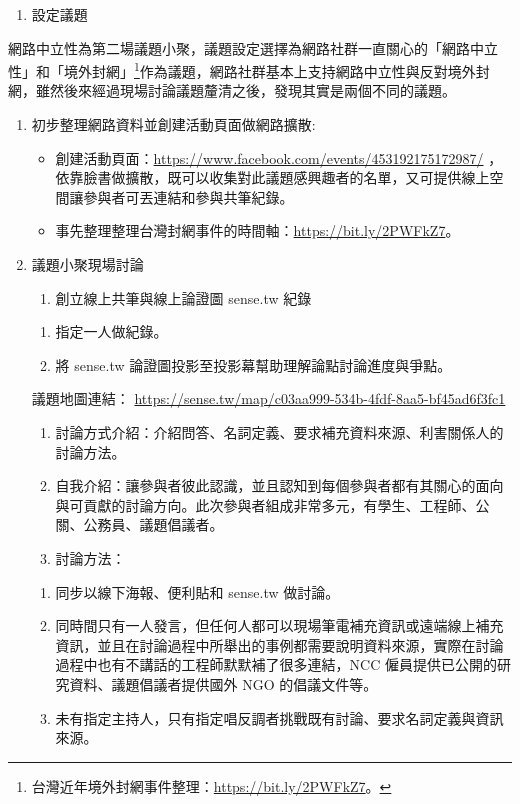 \documentclass[12pt,a4paper]{article}
\begin{document}
\begin{enumerate}
\begin{enumerate}
\item 設定議題
\end{enumerate}
網路中立性為第二場議題小聚，議題設定選擇為網路社群一直關心的「網路中立性」和「境外封網」\footnote{台灣近年境外封網事件整理：\url{https://bit.ly/2PWFkZ7}。}作為議題，網路社群基本上支持網路中立性與反對境外封網，雖然後來經過現場討論議題釐清之後，發現其實是兩個不同的議題。
\begin{enumerate}
\item 初步整理網路資料並創建活動頁面做網路擴散:
\begin{itemize}
\item 創建活動頁面：\url{https://www.facebook.com/events/453192175172987/} ，依靠臉書做擴散，既可以收集對此議題感興趣者的名單，又可提供線上空間讓參與者可丟連結和參與共筆紀錄。
\item 事先整理整理台灣封網事件的時間軸：\url{https://bit.ly/2PWFkZ7}。
\end{itemize}
\item 議題小聚現場討論
\begin{enumerate}
\item 創立線上共筆與線上論證圖 sense.tw 紀錄
\end{enumerate}
\begin{enumerate}
\item 指定一人做紀錄。
\item 將 sense.tw 論證圖投影至投影幕幫助理解論點討論進度與爭點。
\end{enumerate}
議題地圖連結： \url{https://sense.tw/map/c03aa999-534b-4fdf-8aa5-bf45ad6f3fc1}
\begin{enumerate}
\item 討論方式介紹：介紹問答、名詞定義、要求補充資料來源、利害關係人的討論方法。
\item 自我介紹：讓參與者彼此認識，並且認知到每個參與者都有其關心的面向與可貢獻的討論方向。此次參與者組成非常多元，有學生、工程師、公關、公務員、議題倡議者。
\item 討論方法：
\end{enumerate}
\begin{enumerate}
\item 同步以線下海報、便利貼和 sense.tw 做討論。
\item 同時間只有一人發言，但任何人都可以現場筆電補充資訊或遠端線上補充資訊，並且在討論過程中所舉出的事例都需要說明資料來源，實際在討論過程中也有不講話的工程師默默補了很多連結，NCC 僱員提供已公開的研究資料、議題倡議者提供國外 NGO 的倡議文件等。
\item 未有指定主持人，只有指定唱反調者挑戰既有討論、要求名詞定義與資訊來源。

\end{enumerate}
\end{enumerate}
\end{enumerate}
\end{document}
